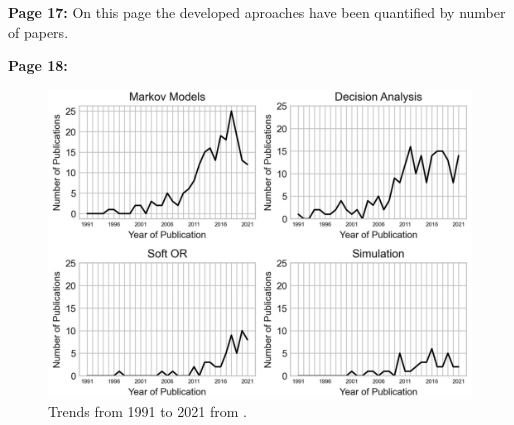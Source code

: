     \textbf{Page 17:}
    On this page the developed aproaches have been quantified by number of papers.
    
    \textbf{Page 18:}
    \begin{figure}[H]
        \centering
        \includegraphics[width=.9\textwidth]{figures/SR0005GB23/fig6.png}
        \caption{Trends from 1991 to 2021 from \cite{x122}.}
        \label{fig6:SR0005GB23}
    \end{figure}
    
